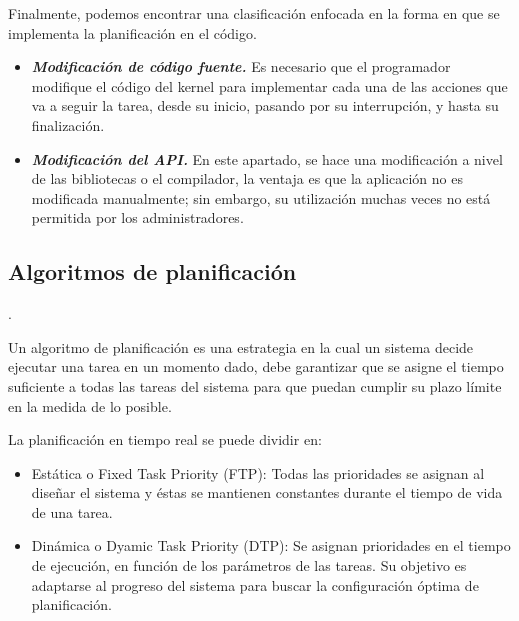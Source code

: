Finalmente, podemos encontrar una clasificación enfocada en la forma en que se implementa la planificación en el código.

\begin{itemize}

\item \textbf{\textit{Modificación de código fuente.}}
	Es necesario que el programador modifique el código del kernel para implementar cada una de las acciones que va a seguir la tarea, desde su inicio, pasando por su interrupción, y hasta su finalización.
	
\item \textbf{\textit{Modificación del API.}}
	En este apartado, se hace una modificación a nivel de las bibliotecas o el compilador, la ventaja es que la aplicación no es modificada manualmente; sin embargo, su utilización muchas veces no está permitida por los administradores.
	
\end{itemize}

    \subsection{Algoritmos de planificación}\label{sec:AlgoPlan}. 
    
    Un algoritmo de planificación es una estrategia en la cual un sistema decide ejecutar una tarea en un momento dado, debe garantizar que se asigne el tiempo suficiente a todas las tareas del sistema para que puedan cumplir su plazo límite en la medida de lo posible.
    
    La planificación en tiempo real se puede dividir en:
    \begin{itemize}
    \item Estática o Fixed Task Priority (FTP):  Todas las prioridades se asignan al diseñar el sistema y éstas se mantienen constantes durante el tiempo de vida de una tarea.
    \item Dinámica o Dyamic Task Priority (DTP): Se asignan prioridades en el tiempo de ejecución, en función de los parámetros de las tareas. Su objetivo es adaptarse al progreso del sistema para buscar la configuración óptima de planificación.
    \end{itemize}   
    
